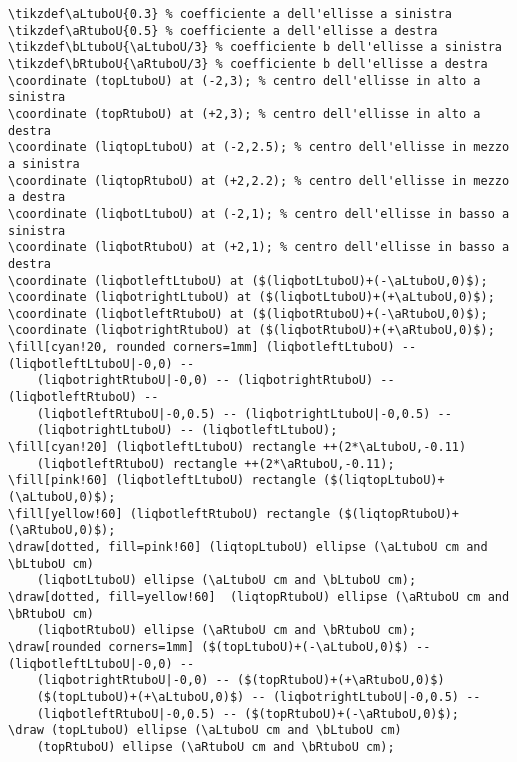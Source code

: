 \documentclass[italian, a4paper]{article}
\def\colorcodice{gray}
\begin{document}
\color{\colorcodice}\begin{Verbatim}[frame=single]
\tikzdef\aLtuboU{0.3} % coefficiente a dell'ellisse a sinistra
\tikzdef\aRtuboU{0.5} % coefficiente a dell'ellisse a destra
\tikzdef\bLtuboU{\aLtuboU/3} % coefficiente b dell'ellisse a sinistra
\tikzdef\bRtuboU{\aRtuboU/3} % coefficiente b dell'ellisse a destra
\coordinate (topLtuboU) at (-2,3); % centro dell'ellisse in alto a sinistra
\coordinate (topRtuboU) at (+2,3); % centro dell'ellisse in alto a destra
\coordinate (liqtopLtuboU) at (-2,2.5); % centro dell'ellisse in mezzo a sinistra
\coordinate (liqtopRtuboU) at (+2,2.2); % centro dell'ellisse in mezzo a destra
\coordinate (liqbotLtuboU) at (-2,1); % centro dell'ellisse in basso a sinistra
\coordinate (liqbotRtuboU) at (+2,1); % centro dell'ellisse in basso a destra
\coordinate (liqbotleftLtuboU) at ($(liqbotLtuboU)+(-\aLtuboU,0)$);
\coordinate (liqbotrightLtuboU) at ($(liqbotLtuboU)+(+\aLtuboU,0)$);
\coordinate (liqbotleftRtuboU) at ($(liqbotRtuboU)+(-\aRtuboU,0)$);
\coordinate (liqbotrightRtuboU) at ($(liqbotRtuboU)+(+\aRtuboU,0)$);
\fill[cyan!20, rounded corners=1mm] (liqbotleftLtuboU) -- (liqbotleftLtuboU|-0,0) --
    (liqbotrightRtuboU|-0,0) -- (liqbotrightRtuboU) -- (liqbotleftRtuboU) --
    (liqbotleftRtuboU|-0,0.5) -- (liqbotrightLtuboU|-0,0.5) --
    (liqbotrightLtuboU) -- (liqbotleftLtuboU);
\fill[cyan!20] (liqbotleftLtuboU) rectangle ++(2*\aLtuboU,-0.11)
    (liqbotleftRtuboU) rectangle ++(2*\aRtuboU,-0.11);
\fill[pink!60] (liqbotleftLtuboU) rectangle ($(liqtopLtuboU)+(\aLtuboU,0)$);
\fill[yellow!60] (liqbotleftRtuboU) rectangle ($(liqtopRtuboU)+(\aRtuboU,0)$);
\draw[dotted, fill=pink!60] (liqtopLtuboU) ellipse (\aLtuboU cm and \bLtuboU cm)
    (liqbotLtuboU) ellipse (\aLtuboU cm and \bLtuboU cm);
\draw[dotted, fill=yellow!60]  (liqtopRtuboU) ellipse (\aRtuboU cm and \bRtuboU cm)
    (liqbotRtuboU) ellipse (\aRtuboU cm and \bRtuboU cm);
\draw[rounded corners=1mm] ($(topLtuboU)+(-\aLtuboU,0)$) -- (liqbotleftLtuboU|-0,0) --
    (liqbotrightRtuboU|-0,0) -- ($(topRtuboU)+(+\aRtuboU,0)$)
    ($(topLtuboU)+(+\aLtuboU,0)$) -- (liqbotrightLtuboU|-0,0.5) --
    (liqbotleftRtuboU|-0,0.5) -- ($(topRtuboU)+(-\aRtuboU,0)$);
\draw (topLtuboU) ellipse (\aLtuboU cm and \bLtuboU cm)
    (topRtuboU) ellipse (\aRtuboU cm and \bRtuboU cm);
\end{Verbatim}
\vspace*{-4mm}\color{black}
\end{document}

